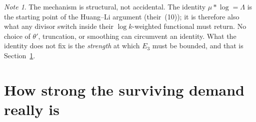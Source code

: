\documentclass[11pt,a4paper]{article}
\theoremstyle{plain}
\theoremstyle{definition}
\theoremstyle{remark}
\newtheorem{note}[theorem]{Note}
\begin{document}
\begin{note}
The mechanism is structural, not accidental. The identity
$\mu*\log=\Lambda$ is the starting point of the Huang--Li argument
(their~(10)); it is therefore also what any divisor switch inside
their $\log k$-weighted functional must return. No choice of
$\theta'$, truncation, or smoothing can circumvent an identity. What
the identity does not fix is the \emph{strength} at which $E_3$ must
be bounded, and that is Section~\ref{sec:strength}.
\end{note}

\section{How strong the surviving demand really is}\label{sec:strength}
\end{document}
